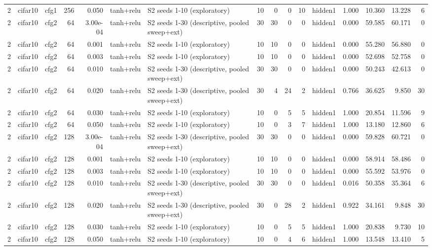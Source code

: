 \begin{table}[htbp]
{\begin{tabular}{@{}rllrrllrrrrlrrrr@{}}
2 & cifar10 & cfg1 & 256 & 0.050 & tanh+relu & S2 seeds 1-10 (exploratory) & 10 & 0 & 0 & 10 & hidden1 & 1.000 & 10.360 & 13.228 & 6 \\
2 & cifar10 & cfg2 & 64 & 3.00e-04 & tanh+relu & S2 seeds 1-30 (descriptive, pooled sweep+ext) & 30 & 30 & 0 & 0 & hidden1 & 0.000 & 59.585 & 60.171 & 0 \\
2 & cifar10 & cfg2 & 64 & 0.001 & tanh+relu & S2 seeds 1-10 (exploratory) & 10 & 10 & 0 & 0 & hidden1 & 0.000 & 55.280 & 56.880 & 0 \\
2 & cifar10 & cfg2 & 64 & 0.003 & tanh+relu & S2 seeds 1-10 (exploratory) & 10 & 10 & 0 & 0 & hidden1 & 0.000 & 52.698 & 52.758 & 0 \\
2 & cifar10 & cfg2 & 64 & 0.010 & tanh+relu & S2 seeds 1-30 (descriptive, pooled sweep+ext) & 30 & 30 & 0 & 0 & hidden1 & 0.000 & 50.243 & 42.613 & 0 \\
2 & cifar10 & cfg2 & 64 & 0.020 & tanh+relu & S2 seeds 1-30 (descriptive, pooled sweep+ext) & 30 & 4 & 24 & 2 & hidden1 & 0.766 & 36.625 & 9.850 & 30 \\
2 & cifar10 & cfg2 & 64 & 0.030 & tanh+relu & S2 seeds 1-10 (exploratory) & 10 & 0 & 5 & 5 & hidden1 & 1.000 & 20.854 & 11.596 & 9 \\
2 & cifar10 & cfg2 & 64 & 0.050 & tanh+relu & S2 seeds 1-10 (exploratory) & 10 & 0 & 3 & 7 & hidden1 & 1.000 & 13.180 & 12.860 & 6 \\
2 & cifar10 & cfg2 & 128 & 3.00e-04 & tanh+relu & S2 seeds 1-30 (descriptive, pooled sweep+ext) & 30 & 30 & 0 & 0 & hidden1 & 0.000 & 59.828 & 60.721 & 0 \\
2 & cifar10 & cfg2 & 128 & 0.001 & tanh+relu & S2 seeds 1-10 (exploratory) & 10 & 10 & 0 & 0 & hidden1 & 0.000 & 58.914 & 58.486 & 0 \\
2 & cifar10 & cfg2 & 128 & 0.003 & tanh+relu & S2 seeds 1-10 (exploratory) & 10 & 10 & 0 & 0 & hidden1 & 0.000 & 55.592 & 53.976 & 0 \\
2 & cifar10 & cfg2 & 128 & 0.010 & tanh+relu & S2 seeds 1-30 (descriptive, pooled sweep+ext) & 30 & 30 & 0 & 0 & hidden1 & 0.016 & 50.358 & 35.364 & 6 \\
2 & cifar10 & cfg2 & 128 & 0.020 & tanh+relu & S2 seeds 1-30 (descriptive, pooled sweep+ext) & 30 & 0 & 28 & 2 & hidden1 & 0.922 & 34.161 & 9.848 & 30 \\
2 & cifar10 & cfg2 & 128 & 0.030 & tanh+relu & S2 seeds 1-10 (exploratory) & 10 & 0 & 5 & 5 & hidden1 & 1.000 & 20.838 & 9.730 & 10 \\
2 & cifar10 & cfg2 & 128 & 0.050 & tanh+relu & S2 seeds 1-10 (exploratory) & 10 & 0 & 4 & 6 & hidden1 & 1.000 & 13.548 & 13.410 & 5 \\

\end{tabular}}
\end{table}
